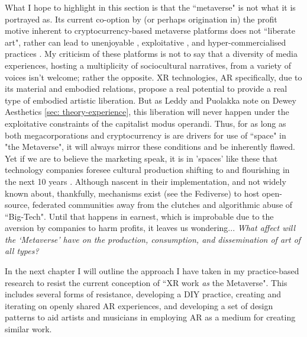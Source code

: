 What I hope to highlight in this section is that the ``metaverse" is not what it is portrayed as. Its current co-option by (or perhaps origination in) the profit motive inherent to cryptocurrency-based metaverse platforms does not ``liberate art", rather can lead to unenjoyable \citep{dejesus2022,delic2022}, exploitative , and hyper-commercialised practices \citep[]{ledesma2021,ongwesojr.2022,gach2022}. My criticism of these platforms is not to say that a diversity of media experiences, hosting a multiplicity of sociocultural narratives, from a variety of voices isn't welcome; rather the opposite. XR technologies, AR specifically, due to its material and embodied relations, propose a real potential to provide a real type of embodied artistic liberation. But as Leddy and Puolakka note on Dewey Aesthetics \autoref{sec: theory-experience}, this liberation will never happen under the exploitative constraints of the capitalist modus operandi. Thus, for as long as both megacorporations and cryptocurrency is are drivers for use of ``space" in "the Metaverse", it will always mirror these conditions and be inherently flawed. Yet if we are to believe the marketing speak, it is in 'spaces' like these that technology companies foresee cultural production shifting to and flourishing in the next 10 years \citep[]{fatemi2022}. Although nascent in their implementation, and not widely known about, thankfully, mechanisms exist (see the Fediverse) to host open-source, federated communities away from the clutches and algorithmic abuse of ``Big-Tech". Until that happens in earnest, which is improbable due to the aversion by companies to harm profits, it leaves us wondering... \textit{What affect will the `Metaverse' have on the production, consumption, and dissemination of art of all types?}

In the next chapter I will outline the approach I have taken in my practice-based research to resist the current conception of ``XR work \textit{as} the Metaverse". This includes several forms of resistance, developing a DIY practice, creating and iterating on openly shared AR experiences, and developing a set of design patterns to aid artists and musicians in employing AR as a medium for creating similar work.